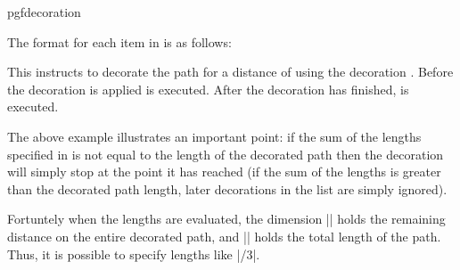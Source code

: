 \begin{environment}{{pgfdecoration}}
	
	The format for each item in  is as follows:
	
	
	This instructs \pgfname{} to decorate the path for a distance
	of  using the decoration . Before the
	decoration is applied  is executed. After the
	decoration has finished,  is executed.
			
\begin{codeexample}[]
\end{codeexample}

	The above example illustrates an important point: if the sum of 
	the lengths specified in  is not equal to 
	the length of the decorated path then the decoration will simply 
	stop at the point it has reached (if the sum of the lengths is 
	greater than the decorated path length, later decorations in the 
	list are simply ignored). 
		
	Fortuntely when the lengths are evaluated, the dimension
	|\pgfdecoratedremainingdistance| holds the remaining distance on
	the entire decorated path, and |\pgfdecoratedpathlength| holds the
	total length of the path. Thus, it is possible to specify lengths
	like |\pgfdecoratedpathlength/3|.

\begin{codeexample}[]
\end{codeexample}


\end{environment}

